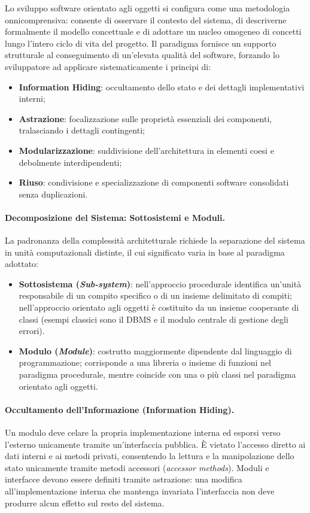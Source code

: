 \documentclass[12pt]{extarticle}
\begin{document}
Lo sviluppo software orientato agli oggetti si configura come una metodologia onnicomprensiva: consente di osservare il contesto del sistema, di descriverne formalmente il modello concettuale e di adottare un nucleo omogeneo di concetti lungo l'intero ciclo di vita del progetto. 
Il paradigma fornisce un supporto strutturale al conseguimento di un'elevata qualità del software, forzando lo sviluppatore ad applicare sistematicamente i principi di: 
\begin{itemize}
    \item \textbf{Information Hiding}: occultamento dello stato e dei dettagli implementativi interni;
    \item \textbf{Astrazione}: focalizzazione sulle proprietà essenziali dei componenti, tralasciando i dettagli contingenti; 
    \item \textbf{Modularizzazione}: suddivisione dell'architettura in elementi coesi e debolmente interdipendenti; 
    \item \textbf{Riuso}: condivisione e specializzazione di componenti software consolidati senza duplicazioni. 
\end{itemize}

\paragraph{Decomposizione del Sistema: Sottosistemi e Moduli.}
La padronanza della complessità architetturale richiede la separazione del sistema in unità computazionali distinte, il cui significato varia in base al paradigma adottato: 
\begin{itemize}
    \item \textbf{Sottosistema (\textit{Sub-system})}: nell'approccio procedurale identifica un'unità responsabile di un compito specifico o di un insieme delimitato di compiti; nell'approccio orientato agli oggetti è costituito da un insieme cooperante di classi (esempi classici sono il DBMS e il modulo centrale di gestione degli errori). 
    \item \textbf{Modulo (\textit{Module})}: costrutto maggiormente dipendente dal linguaggio di programmazione; corrisponde a una libreria o insieme di funzioni nel paradigma procedurale, mentre coincide con una o più classi nel paradigma orientato agli oggetti. 
\end{itemize}

\paragraph{Occultamento dell'Informazione (Information Hiding).}
Un modulo deve celare la propria implementazione interna ed esporsi verso l'esterno unicamente tramite un'interfaccia pubblica. 
È vietato l'accesso diretto ai dati interni e ai metodi privati, consentendo la lettura e la manipolazione dello stato unicamente tramite metodi accessori (\textit{accessor methods}). 
Moduli e interfacce devono essere definiti tramite astrazione: una modifica all'implementazione interna che mantenga invariata l'interfaccia non deve produrre alcun effetto sul resto del sistema. 
\end{document}
